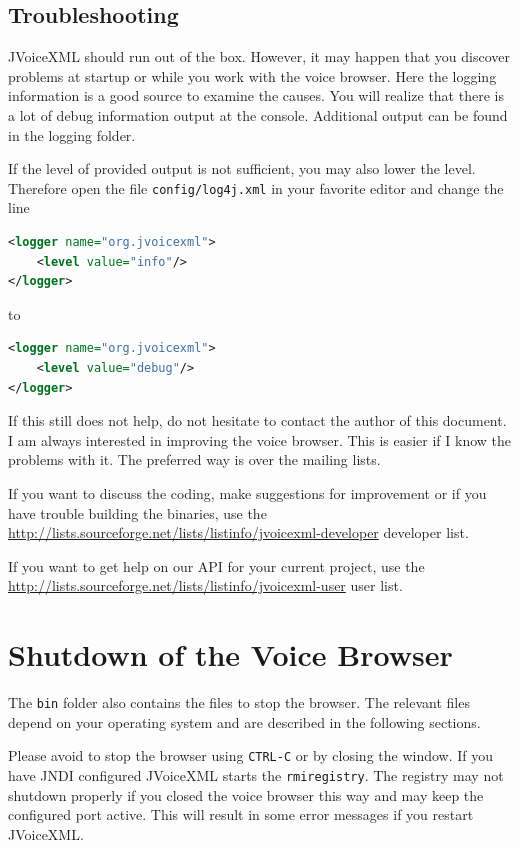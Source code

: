 \documentclass[11pt,a4paper]{article}
\begin{document}
\subsection{Troubleshooting}

JVoiceXML should run out of the box. However, it may happen that you discover
problems at startup or while you work with the voice browser. Here the logging
information is a good source to examine the causes. You will realize that there
is a lot of debug information output at the console. Additional output can be
found in the logging folder.

If the level of provided output is not sufficient, you may also lower the level.
Therefore open the file \lstinline{config/log4j.xml} in your favorite editor
and change the line

\begin{lstlisting}[language=XML]
<logger name="org.jvoicexml">
    <level value="info"/>
</logger>
\end{lstlisting}

to

\begin{lstlisting}[language=XML]
<logger name="org.jvoicexml">
    <level value="debug"/>
</logger>
\end{lstlisting}

If this still does not help, do not hesitate to contact the author of this
document. I am always interested in improving the voice browser. This is
easier if I know the problems with it. The preferred way is over the mailing
lists.

If you want to discuss the coding, make suggestions for improvement or if
you have trouble building the binaries, use the
\url{http://lists.sourceforge.net/lists/listinfo/jvoicexml-developer}
developer list.

If you want to get help on our API for your current project, use the
\url{http://lists.sourceforge.net/lists/listinfo/jvoicexml-user} user list.

\section{Shutdown of the Voice Browser}

The \texttt{bin} folder also contains the files to stop the browser. The
relevant files depend on your operating system and are described in the following
sections.

Please avoid to stop the browser using \lstinline{CTRL-C} or by closing the
window. If you have JNDI configured JVoiceXML starts the \lstinline{rmiregistry}.
The registry may not shutdown properly if you closed the voice browser this way
and may keep the configured port active. This will result in some error messages
if you restart JVoiceXML.
\end{document}

